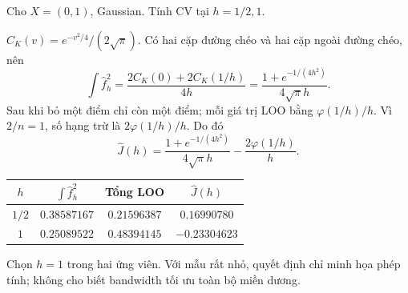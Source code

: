 \begin{exercise}
Cho $X=(0,1)$, Gaussian. Tính CV tại $h=1/2,1$.
\end{exercise}
\begin{solution}
$C_K(v)=e^{-v^2/4}/(2\sqrt\pi)$. Có hai cặp đường chéo và hai cặp
ngoài đường chéo, nên
\[
\int\widehat f_h^2=\frac{2C_K(0)+2C_K(1/h)}{4h}
=\frac{1+e^{-1/(4h^2)}}{4\sqrt\pi h}.
\]
Sau khi bỏ một điểm chỉ còn một điểm; mỗi giá trị LOO bằng
$\varphi(1/h)/h$. Vì $2/n=1$, số hạng trừ là
$2\varphi(1/h)/h$. Do đó
\[
\boxed{\widehat J(h)=\frac{1+e^{-1/(4h^2)}}{4\sqrt\pi h}
-\frac{2\varphi(1/h)}h.}
\]
\begin{center}
\begin{tabular}{cccc}
\toprule $h$ & $\int\widehat f_h^2$ & Tổng LOO & $\widehat J(h)$\\\midrule
$1/2$ & $0.38587167$ & $0.21596387$ & $0.16990780$\\
$1$ & $0.25089522$ & $0.48394145$ & $-0.23304623$\\\bottomrule
\end{tabular}
\end{center}
Chọn $\boxed{h=1}$ trong hai ứng viên. Với mẫu rất nhỏ, quyết định chỉ
minh họa phép tính; không cho biết bandwidth tối ưu toàn bộ miền dương.
\end{solution}

